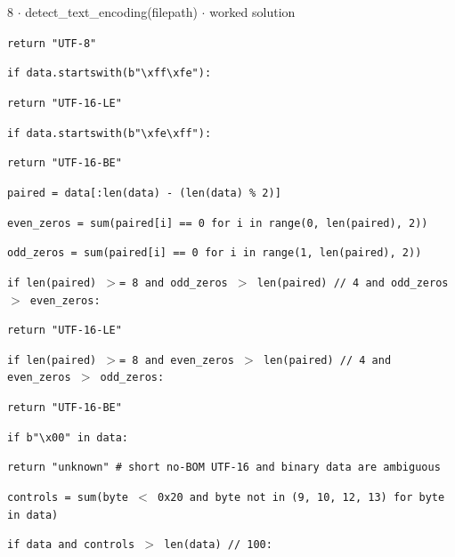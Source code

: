 \documentclass[11pt]{article}
\begin{document}
\begin{keepsection}
\begin{workedbox}{8 \ensuremath{\cdot} detect\_text\_encoding(filepath) \ensuremath{\cdot} worked solution}
\begin{enumerate}
\begin{tcolorbox}[colback=Paperblue,colframe=Paperblue,boxrule=0pt,arc=0pt,left=7pt,right=7pt,top=5pt,bottom=5pt]
\noindent\hspace*{3em}\texttt{return "UTF-8"}\par
\noindent\hspace*{1em}\texttt{if data.startswith(b"\textbackslash{}xff\textbackslash{}xfe"):}\par
\noindent\hspace*{3em}\texttt{return "UTF-16-LE"}\par
\noindent\hspace*{1em}\texttt{if data.startswith(b"\textbackslash{}xfe\textbackslash{}xff"):}\par
\noindent\hspace*{3em}\texttt{return "UTF-16-BE"}\par
\noindent\hspace*{1em}\texttt{paired = data[:len(data) - (len(data) \% 2)]}\par
\noindent\hspace*{1em}\texttt{even\_zeros = sum(paired[i] == 0 for i in range(0, len(paired), 2))}\par
\noindent\hspace*{1em}\texttt{odd\_zeros = sum(paired[i] == 0 for i in range(1, len(paired), 2))}\par
\noindent\hspace*{1em}\texttt{if len(paired) \ensuremath{>}= 8 and odd\_zeros \ensuremath{>} len(paired) // 4 and odd\_zeros \ensuremath{>} even\_zeros:}\par
\noindent\hspace*{3em}\texttt{return "UTF-16-LE"}\par
\noindent\hspace*{1em}\texttt{if len(paired) \ensuremath{>}= 8 and even\_zeros \ensuremath{>} len(paired) // 4 and even\_zeros \ensuremath{>} odd\_zeros:}\par
\noindent\hspace*{3em}\texttt{return "UTF-16-BE"}\par
\noindent\hspace*{1em}\texttt{if b"\textbackslash{}x00" in data:}\par
\noindent\hspace*{3em}\texttt{return "unknown" \# short no-BOM UTF-16 and binary data are ambiguous}\par
\noindent\hspace*{1em}\texttt{controls = sum(byte \ensuremath{<} 0x20 and byte not in (9, 10, 12, 13) for byte in data)}\par
\noindent\hspace*{1em}\texttt{if data and controls \ensuremath{>} len(data) // 100:}\par

\end{tcolorbox}
\end{enumerate}
\end{workedbox}
\end{keepsection}
\end{document}
